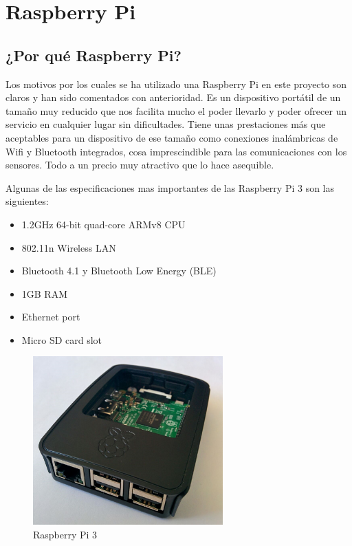 \chapter{Raspberry Pi}

\section{¿Por qué Raspberry Pi?}

Los motivos por los cuales se ha utilizado una Raspberry Pi en este proyecto son claros y han sido comentados con anterioridad. Es un dispositivo portátil de un tamaño muy reducido que nos facilita mucho el poder llevarlo y poder ofrecer un servicio en cualquier lugar sin dificultades. Tiene unas prestaciones más que aceptables para un dispositivo de ese tamaño como conexiones inalámbricas de Wifi y Bluetooth integrados, cosa imprescindible para las comunicaciones con los sensores. Todo a un precio muy atractivo que lo hace asequible.  

Algunas de las especificaciones mas importantes de las Raspberry Pi 3 son las siguientes:
\begin{itemize}
\item 1.2GHz 64-bit quad-core ARMv8 CPU
\item 802.11n Wireless LAN
\item Bluetooth 4.1 y Bluetooth Low Energy (BLE)
\item 1GB RAM
\item Ethernet port
\item Micro SD card slot 
\end{itemize}

\begin{figure}[htb]
\begin{center}
\includegraphics[width=0.65\textwidth]{./setup/raspi}
\caption{Raspberry Pi 3}
\end{center}
\end{figure}


